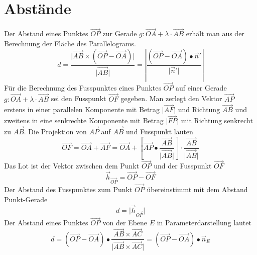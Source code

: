 \section{Abstände}
Der Abstand eines Punktes $\overrightarrow{OP}$ zur Gerade $g:\overrightarrow{OA}+\lambda\cdot \overrightarrow{AB}$ erhält man aus der Berechnung der Fläche des Parallelograms. 
\begin{equation}
\boxed{d=\dfrac{\Big\vert\overrightarrow{AB}\times\left(\overrightarrow{OP}-\overrightarrow{OA}\right)\Big\vert}{\Big\vert\overrightarrow{AB}\Big\vert}=\left\vert\dfrac{\left(\overrightarrow{OP}-\overrightarrow{OA}\right)\bullet \overrightarrow{n}'}{\Big\vert\overrightarrow{n}'\Big\vert}\right\vert}
\end{equation}
Für die Berechnung des Fusspunktes eines Punktes $\overrightarrow{OP}$ auf einer Gerade $g:\overrightarrow{OA}+\lambda\cdot \overrightarrow{AB}$ sei den Fusspunkt $\overrightarrow{OF}$ gegeben. Man zerlegt den Vektor $\overrightarrow{AP}$ erstens in einer parallelen Komponente mit Betrag $\Big\vert\overrightarrow{AF}\Big\vert$ und Richtung $\overrightarrow{AB}$ und zweitens in eine senkrechte Komponente mit Betrag $\Big\vert\overrightarrow{FP}\Big\vert$ mit Richtung senkrecht zu $\overrightarrow{AB}$.
\newline\newline
Die Projektion von $\overrightarrow{AP}$ auf $\overrightarrow{AB}$ und Fusspunkt lauten
\begin{equation}
\boxed{\overrightarrow{OF}=\overrightarrow{OA}+\overrightarrow{AF}=\overrightarrow{OA}+\left[\overrightarrow{AP}\bullet \dfrac{\overrightarrow{AB}}{\Big\vert\overrightarrow{AB}\Big\vert}\right]\cdot \dfrac{\overrightarrow{AB}}{\Big\vert\overrightarrow{AB}\Big\vert}}
\end{equation}
Das Lot ist der Vektor zwischen dem Punkt $\overrightarrow{OP}$ und der Fusspunkt $\overrightarrow{OF}$
\begin{equation}
\boxed{\overrightarrow{h}_{\overrightarrow{OP}}=\overrightarrow{OP}-\overrightarrow{OF}}
\end{equation}
Der Abstand des Fusspunktes zum Punkt $\overrightarrow{OP}$ übereinstimmt mit dem Abstand Punkt-Gerade
\begin{equation}
\boxed{d=\Big\vert\overrightarrow{h}_{\overrightarrow{OP}}\Big\vert}
\end{equation}
Der Abstand eines Punktes $\overrightarrow{OP}$ von der Ebene $E$ in Parameterdarstellung lautet
\begin{equation}
\boxed{d=\left(\overrightarrow{OP}-\overrightarrow{OA}\right)\bullet \dfrac{\overrightarrow{AB}\times \overrightarrow{AC}}{\Big\vert\overrightarrow{AB}\times \overrightarrow{AC}\Big\vert}=\left(\overrightarrow{OP}-\overrightarrow{OA}\right)\bullet \overrightarrow{n}_E}
\end{equation}
